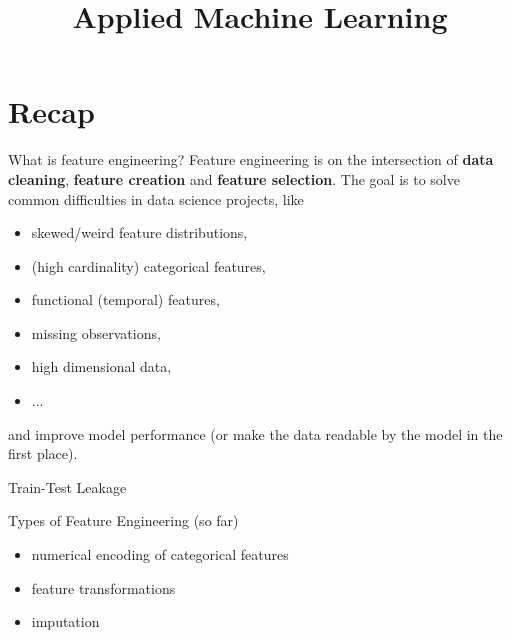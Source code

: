 \documentclass[11pt,compress,t,notes=noshow, aspectratio=169, xcolor=table]{beamer}
\title{Applied Machine Learning}
\date{}
\begin{document}
\newcommand{\titlefigure}{figure/empty}
\newcommand{\learninggoals}{
    \item Reasons for Feature Selection
    \item Types of Feature Selection}


\section{Recap}

\begin{frame}{What is feature engineering?}
Feature engineering is on the intersection of \textbf{data cleaning}, \textbf{feature
creation} and \textbf{feature selection}.
\vfill
The goal is to solve common difficulties in data science projects, like
\vfill
\begin{itemize}
    \item skewed/weird feature distributions,
    \item (high cardinality) categorical features,
    \item functional (temporal) features,
    \item missing observations,
    \item high dimensional data,
    \item ...
\end{itemize}
\vfill
and improve model performance (or make the data readable by the model in the first place).
\end{frame}

\begin{frame}{Train-Test Leakage}

\end{frame}

\begin{frame}{Types of Feature Engineering (so far)}
\begin{itemize}
    \item numerical encoding of categorical features
    \item feature transformations
    \item imputation
\end{itemize}
\end{frame}
\end{document}
